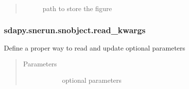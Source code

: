 \documentclass[letterpaper,10pt,english]{sphinxmanual}
\begin{document}
\begin{fulllineitems}
\begin{fulllineitems}
\begin{quote}
\begin{description}
\begin{description}
\item[{}] \leavevmode{[}\sphinxtitleref{matplotlib.axes}{]}
path to store the figure

\end{description}

\end{description}\end{quote}

\end{fulllineitems}



\subsubsection{sdapy.snerun.snobject.read\_kwargs}
\label{\detokenize{generated/sdapy.snerun.snobject.read_kwargs:sdapy-snerun-snobject-read-kwargs}}\label{\detokenize{generated/sdapy.snerun.snobject.read_kwargs::doc}}

\begin{fulllineitems}
\label{\detokenize{generated/sdapy.snerun.snobject.read_kwargs:sdapy.snerun.snobject.read_kwargs}}
Define a proper way to read and update optional parameters
\begin{quote}\begin{description}
\item[{Parameters}] \leavevmode\begin{description}
\item[{}] \leavevmode{[}\sphinxtitleref{Keyword Arguments}{]}
optional parameters

\end{description}

\end{description}\end{quote}



\begin{description}
\item[{{\hyperref[\detokenize{generated/sdapy.snerun.snobject.__init__:sdapy.snerun.snobject.__init__}]{}}}] \leavevmode
\end{description}




\end{fulllineitems}
\end{fulllineitems}
\end{document}
